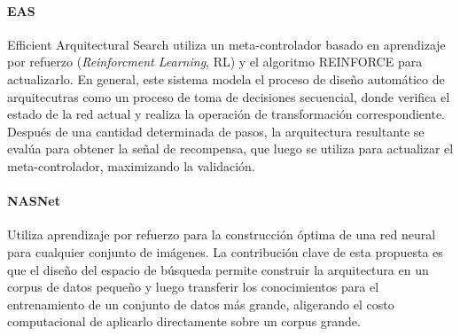 

        \paragraph*{EAS } Efficient Arquitectural Search utiliza un meta-controlador basado en aprendizaje por refuerzo  (\textit{Reinforcment Learning}, RL)  y el algoritmo REINFORCE  para actualizarlo. En general, este sistema modela el proceso de dise\~no autom\'atico de arquitecutras como un proceso de toma de decisiones secuencial, donde verifica el estado de la red actual y realiza la operaci\'on de transformaci\'on correspondiente. Despu\'es de una cantidad determinada de pasos, la arquitectura resultante se eval\'ua para obtener la se\~nal de recompensa, que luego se utiliza para actualizar el meta-controlador, maximizando la validaci\'on.

        \paragraph*{NASNet } Utiliza aprendizaje por refuerzo para la construcci\'on \'optima de una red neural para cualquier conjunto de im\'agenes. La contribuci\'on clave de esta propuesta es que el diseño del espacio de b\'usqueda permite construir la arquitectura en un corpus de datos peque\~no y luego transferir los conocimientos para el entrenamiento de un conjunto de datos m\'as grande, aligerando el costo computacional de aplicarlo directamente sobre un corpus grande.



